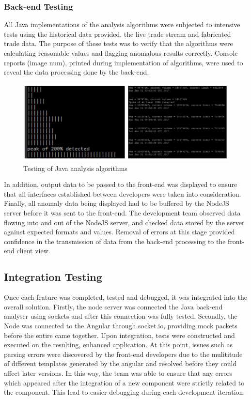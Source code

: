 \documentclass[12pt]{article}
\begin{document}
    \subsubsection{Back-end Testing}
    All Java implementations of the analysis algorithms were subjected to intensive tests using the historical data provided, the live trade stream and fabricated trade data.
    The purpose of these tests was to verify that the algorithms were calculating reasonable values and flagging anomalous results correctly.
    Console reports (image num), printed during implementation of algorithms, were used to reveal the data processing done by the back-end.
    \begin{figure}[H]
    \centering
    \includegraphics[width=130mm]{backtest.png}
    \caption{Testing of Java analysis algorithms}
    \end{figure}
    In addition, output data to be passed to the front-end was displayed to ensure that all interfaces established between developers were taken into consideration.
	  Finally, all anomaly data being displayed had to be buffered by the NodeJS server before it was sent to the front-end. The development team observed data flowing into and out of the NodeJS server,
    and checked data stored by the server against expected formats and values. Removal of errors at this stage provided confidence in the transmission of data from the back-end processing to the front-end client view.
    \subsection{Integration Testing}
    Once each feature was completed, tested and debugged, it was integrated into the overall solution. Firstly, the node server was connected the Java back-end analyser using sockets and after this connection was fully tested.
    Secondly, the Node was connected to the Angular through socket.io, providing mock packets before the entire came together. Upon integration, tests were constructed and executed on the resulting, enhanced application.
    At this point, issues such as parsing errors were discovered by the front-end developers due to the mulititude of different templates generated by the angular and resolved before they could affect later versions.
    In this way, the team was able to ensure that any errors which appeared after the integration of a new component were strictly related to the component.
    This lead to easier debugging during each development iteration.
\end{document}
